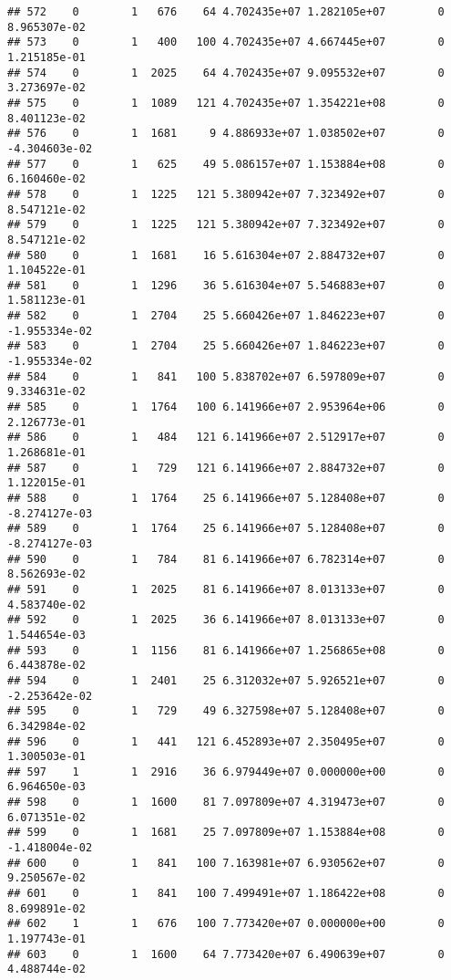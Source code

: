 \documentclass[
]{article}
\begin{document}
\begin{enumerate}
\begin{verbatim}
## 572    0        1   676    64 4.702435e+07 1.282105e+07        0  8.965307e-02
## 573    0        1   400   100 4.702435e+07 4.667445e+07        0  1.215185e-01
## 574    0        1  2025    64 4.702435e+07 9.095532e+07        0  3.273697e-02
## 575    0        1  1089   121 4.702435e+07 1.354221e+08        0  8.401123e-02
## 576    0        1  1681     9 4.886933e+07 1.038502e+07        0 -4.304603e-02
## 577    0        1   625    49 5.086157e+07 1.153884e+08        0  6.160460e-02
## 578    0        1  1225   121 5.380942e+07 7.323492e+07        0  8.547121e-02
## 579    0        1  1225   121 5.380942e+07 7.323492e+07        0  8.547121e-02
## 580    0        1  1681    16 5.616304e+07 2.884732e+07        0  1.104522e-01
## 581    0        1  1296    36 5.616304e+07 5.546883e+07        0  1.581123e-01
## 582    0        1  2704    25 5.660426e+07 1.846223e+07        0 -1.955334e-02
## 583    0        1  2704    25 5.660426e+07 1.846223e+07        0 -1.955334e-02
## 584    0        1   841   100 5.838702e+07 6.597809e+07        0  9.334631e-02
## 585    0        1  1764   100 6.141966e+07 2.953964e+06        0  2.126773e-01
## 586    0        1   484   121 6.141966e+07 2.512917e+07        0  1.268681e-01
## 587    0        1   729   121 6.141966e+07 2.884732e+07        0  1.122015e-01
## 588    0        1  1764    25 6.141966e+07 5.128408e+07        0 -8.274127e-03
## 589    0        1  1764    25 6.141966e+07 5.128408e+07        0 -8.274127e-03
## 590    0        1   784    81 6.141966e+07 6.782314e+07        0  8.562693e-02
## 591    0        1  2025    81 6.141966e+07 8.013133e+07        0  4.583740e-02
## 592    0        1  2025    36 6.141966e+07 8.013133e+07        0  1.544654e-03
## 593    0        1  1156    81 6.141966e+07 1.256865e+08        0  6.443878e-02
## 594    0        1  2401    25 6.312032e+07 5.926521e+07        0 -2.253642e-02
## 595    0        1   729    49 6.327598e+07 5.128408e+07        0  6.342984e-02
## 596    0        1   441   121 6.452893e+07 2.350495e+07        0  1.300503e-01
## 597    1        1  2916    36 6.979449e+07 0.000000e+00        0  6.964650e-03
## 598    0        1  1600    81 7.097809e+07 4.319473e+07        0  6.071351e-02
## 599    0        1  1681    25 7.097809e+07 1.153884e+08        0 -1.418004e-02
## 600    0        1   841   100 7.163981e+07 6.930562e+07        0  9.250567e-02
## 601    0        1   841   100 7.499491e+07 1.186422e+08        0  8.699891e-02
## 602    1        1   676   100 7.773420e+07 0.000000e+00        0  1.197743e-01
## 603    0        1  1600    64 7.773420e+07 6.490639e+07        0  4.488744e-02

\end{verbatim}
\end{enumerate}
\end{document}

